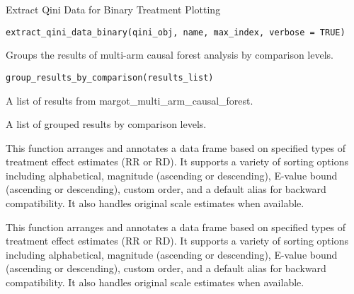 \documentclass[a4paper]{book}
\begin{document}
%
\begin{Description}
Extract Qini Data for Binary Treatment Plotting
\end{Description}
%
\begin{Usage}
\begin{verbatim}
extract_qini_data_binary(qini_obj, name, max_index, verbose = TRUE)
\end{verbatim}
\end{Usage}
%
\begin{Description}
Groups the results of multi-arm causal forest analysis by comparison levels.
\end{Description}
%
\begin{Usage}
\begin{verbatim}
group_results_by_comparison(results_list)
\end{verbatim}
\end{Usage}
%
\begin{Arguments}
\begin{ldescription}
\item[\code{results\_list}] A list of results from margot\_multi\_arm\_causal\_forest.
\end{ldescription}
\end{Arguments}
%
\begin{Value}
A list of grouped results by comparison levels.
\end{Value}
%
\begin{Description}
This function arranges and annotates a data frame based on specified
types of treatment effect estimates (RR or RD). It supports a variety of sorting
options including alphabetical, magnitude (ascending or descending), E-value bound
(ascending or descending), custom order, and a default alias for backward compatibility.
It also handles original scale estimates when available.

This function arranges and annotates a data frame based on specified
types of treatment effect estimates (RR or RD). It supports a variety of sorting
options including alphabetical, magnitude (ascending or descending), E-value bound
(ascending or descending), custom order, and a default alias for backward compatibility.
It also handles original scale estimates when available.
\end{Description}
\end{document}
